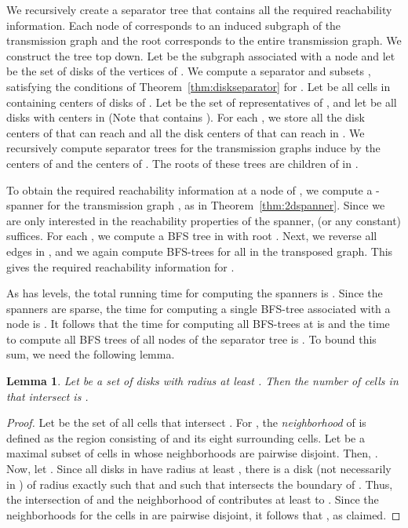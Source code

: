 \documentclass[11pt,a4paper]{paper}
\newtheorem{lemma}[theorem]{Lemma}
\begin{document}
We recursively create a separator tree 
that contains all the required reachability information.
Each node   of  corresponds to an induced subgraph of the transmission graph and
the root corresponds to the entire transmission graph.
We construct the tree top down. Let  be the subgraph associated with a node  and let
 be the set of disks of the vertices of .
We compute a separator   and subsets , satisfying the conditions of Theorem~\ref{thm:diskseparator} for .
Let  be all cells in  containing centers of disks of
 . Let  be the set of representatives of ,
and let  be all disks with centers in  (Note that  contains ).
For each , we store all the disk centers of
 that  can
reach and all the disk centers of
 that can reach  in .
We recursively compute separator trees for  the transmission graphs induce by the centers of  and
the centers of
. The roots of these trees are children of  in .

To obtain the  required reachability information at a node  of ,
we compute a -spanner  for the transmission
graph , as in Theorem~\ref{thm:2dspanner}.
Since we are only
interested in the reachability properties of the spanner,
 (or any constant) suffices.
For each ,
we compute a BFS tree in  with root . Next, we reverse all
edges in , and we again compute BFS-trees for all 
in the transposed graph. This gives the required reachability
information for .

As  has  levels,
the total running time for computing the spanners is
.
Since the spanners are sparse, the time for computing a single BFS-tree
associated with a node  is . It follows that
 the time for computing all
BFS-trees at  is  and the time to compute all BFS trees of all nodes  of
the separator tree  is
. To bound this sum,
we need the
following lemma.

\begin{lemma}
\label{lem:diskunioncover}
Let  be a set of  disks with radius at least . Then
the number of cells in  that intersect
 is .
\end{lemma}

\begin{proof}
Let  be the set of all cells that intersect
. For , the \emph{neighborhood}
of  is defined as the region consisting of
 and its eight surrounding cells.
Let  be a maximal subset of cells
in  whose neighborhoods are pairwise disjoint.
Then, .
Now, let .
Since all disks in  have radius at
least , there is a disk  (not necessarily
in ) of radius
exactly  such that 
and such that  intersects the boundary of .
Thus, the intersection of  and the neighborhood
of  contributes at least  to .
Since the neighborhoods for the cells in  are pairwise disjoint,
it follows that , as claimed.
\end{proof}
\end{document}
